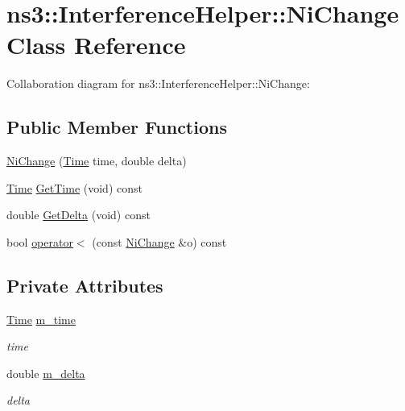 \hypertarget{classns3_1_1InterferenceHelper_1_1NiChange}{}\section{ns3\+:\+:Interference\+Helper\+:\+:Ni\+Change Class Reference}
\label{classns3_1_1InterferenceHelper_1_1NiChange}


Collaboration diagram for ns3\+:\+:Interference\+Helper\+:\+:Ni\+Change\+:
\subsection*{Public Member Functions}
\begin{DoxyCompactItemize}
\item 
\hyperlink{classns3_1_1InterferenceHelper_1_1NiChange_a35916dcd9ad21ef570b03e853ded18dc}{Ni\+Change} (\hyperlink{classns3_1_1Time}{Time} time, double delta)
\item 
\hyperlink{classns3_1_1Time}{Time} \hyperlink{classns3_1_1InterferenceHelper_1_1NiChange_a6f7db2fa18e248cface1291b58dca397}{Get\+Time} (void) const 
\item 
double \hyperlink{classns3_1_1InterferenceHelper_1_1NiChange_a74fb0dd78a56be923ae78aad3eb9dd1d}{Get\+Delta} (void) const 
\item 
bool \hyperlink{classns3_1_1InterferenceHelper_1_1NiChange_aa15f2bd95205434c2860b435166a9675}{operator$<$} (const \hyperlink{classns3_1_1InterferenceHelper_1_1NiChange}{Ni\+Change} \&o) const 
\end{DoxyCompactItemize}
\subsection*{Private Attributes}
\begin{DoxyCompactItemize}
\item 
\hyperlink{classns3_1_1Time}{Time} \hyperlink{classns3_1_1InterferenceHelper_1_1NiChange_aaaca554e6b585a7a0bfe7ff17a4702d8}{m\+\_\+time}
\begin{DoxyCompactList}\small\item\em time \end{DoxyCompactList}\item 
double \hyperlink{classns3_1_1InterferenceHelper_1_1NiChange_a7b2802d10b3b3901a4babdc887dab265}{m\+\_\+delta}
\begin{DoxyCompactList}\small\item\em delta \end{DoxyCompactList}\end{DoxyCompactItemize}


